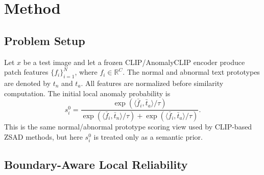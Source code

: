 \section{Method}
\label{sec:method}

\subsection{Problem Setup}

Let $x$ be a test image and let a frozen CLIP/AnomalyCLIP encoder produce
patch features $\{f_i\}_{i=1}^{N}$, where $f_i\in\mathbb{R}^{C}$. The normal
and abnormal text prototypes are denoted by $t_n$ and $t_a$. All features are
normalized before similarity computation. The initial local anomaly probability
is
\begin{equation}
  s_i^0 =
  \frac{\exp(\langle \bar f_i,\bar t_a\rangle/\tau)}
       {\exp(\langle \bar f_i,\bar t_n\rangle/\tau)+
        \exp(\langle \bar f_i,\bar t_a\rangle/\tau)} .
  \label{eq:initial-score}
\end{equation}
This is the same normal/abnormal prototype scoring view used by CLIP-based
ZSAD methods, but here $s_i^0$ is treated only as a semantic prior.

\subsection{Boundary-Aware Local Reliability}


